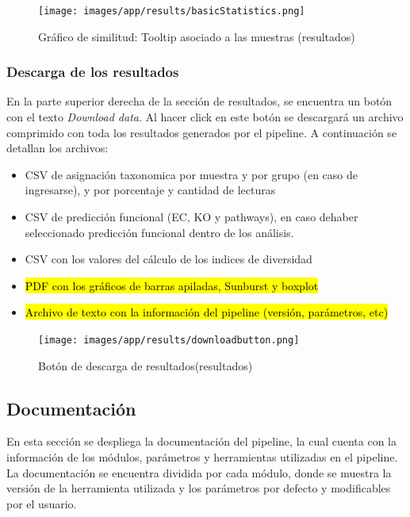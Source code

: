 \begin{figure}[H]
    \texttt{[image: images/app/results/basicStatistics.png]}

    \caption{Gráfico de similitud: Tooltip asociado a las muestras (resultados)}
    \label{fig:app-results-functional}
\end{figure}
\subsubsection{Descarga de los resultados}
En la parte superior derecha de la sección de resultados, se encuentra un botón con el texto \textit{Download data}. 
Al hacer click en este botón se descargará un archivo comprimido con toda los resultados generados por el pipeline.
A continuación se detallan los archivos:
\begin{itemize}
    \item CSV de asignación taxonomica por muestra y por grupo (en caso de ingresarse), y por porcentaje y cantidad de lecturas
    \item CSV de predicción funcional (EC, KO y pathways), en caso dehaber seleccionado predicción funcional dentro de los análisis.
    \item CSV con los valores del cálculo de los indices de diversidad
    \item \hl{PDF con los gráficos de barras apiladas, Sunburst y boxplot}
    \item \hl{Archivo de texto con la información del pipeline (versión, parámetros, etc)}
\end{itemize}

\begin{figure}[H]
    \texttt{[image: images/app/results/downloadbutton.png]}

    \caption{Botón de descarga de resultados(resultados)}
    \label{fig:app-results-download}
\end{figure}
\subsection{Documentación}
En esta sección se despliega la documentación del pipeline, la cual cuenta con la información de los módulos, parámetros y herramientas utilizadas en el pipeline. La documentación se encuentra dividida por cada módulo, donde se muestra la versión de la herramienta utilizada y los parámetros por defecto y modificables por el usuario.
